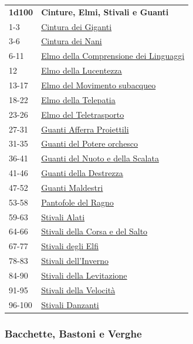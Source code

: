 \begin{multicols}{2}
{{\small\begin{tabularx}{0.45\textwidth}{lX}
\textbf{1d100} & \textbf{Cinture, Elmi, Stivali e Guanti}\\
1-3 & \hyperlink{CinturadeiGiganti}{Cintura dei Giganti}\\
3-6 & \hyperlink{CinturadeiNani}{Cintura dei Nani}\\
6-11 & \hyperlink{ElmodellaComprensionedeiLinguaggi}{Elmo della Comprensione dei Linguaggi}\\
12 & \hyperlink{ElmodellaLucentezza}{Elmo della Lucentezza}\\
13-17 & \hyperlink{ElmodelMovimentosubacqueo}{Elmo del Movimento subacqueo}\\
18-22 & \hyperlink{ElmodellaTelepatia}{Elmo della Telepatia}\\
23-26 & \hyperlink{ElmodelTeletrasporto}{Elmo del Teletrasporto}\\
27-31 & \hyperlink{GuantiAfferraProiettili}{Guanti Afferra Proiettili}\\
31-35 & \hyperlink{GuantidelPotereorchesco}{Guanti del Potere orchesco}\\
36-41 & \hyperlink{GuantidelNuotoedellaScalata}{Guanti del Nuoto e della Scalata}\\
41-46 & \hyperlink{GuantidellaDestrezza}{Guanti della Destrezza}\\
47-52 & \hyperlink{GuantiMaldestri}{Guanti Maldestri}\\
53-58 & \hyperlink{PantofoledelRagno}{Pantofole del Ragno}\\
59-63 & \hyperlink{StivaliAlati}{Stivali Alati}\\
64-66 & \hyperlink{StivalidellaCorsaedelSalto}{Stivali della Corsa e del Salto}\\
67-77 & \hyperlink{StivalidegliElfi}{Stivali degli Elfi}\\
78-83 & \hyperlink{Stivalidell'Inverno}{Stivali dell'Inverno}\\
84-90 & \hyperlink{StivalidellaLevitazione}{Stivali della Levitazione}\\
91-95 & \hyperlink{StivalidellaVelocità}{Stivali della Velocità}\\
96-100 & \hyperlink{StivaliDanzanti}{Stivali Danzanti}\\
\end{tabularx}}

\subsubsection{Bacchette, Bastoni e Verghe}\hypertarget{bastonibacchette}{}\label{bastonibacchette}

}
\end{multicols}
